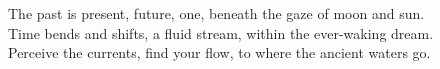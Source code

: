 \documentclass{article}
\begin{document}
\begin{infobox}
The past is present, future, one, beneath the gaze of moon and sun.\\
Time bends and shifts, a fluid stream, within the ever-waking dream.\\
Perceive the currents, find your flow, to where the ancient waters go.
\end{infobox}
\end{document}
